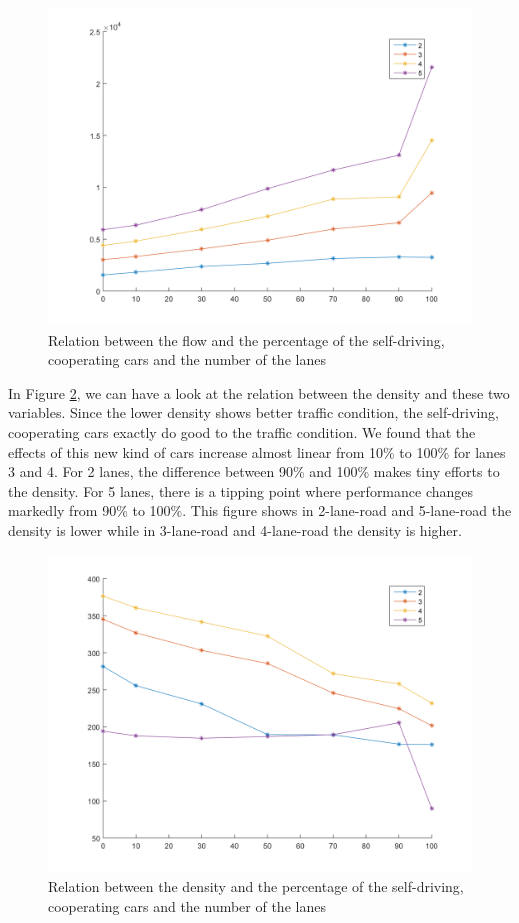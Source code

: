\documentclass[a4paper]{article}
\begin{document}
	\begin{figure}[H]
		\centering
		\includegraphics[scale=0.5]{../imgs/all_2}
		\caption{Relation between the flow and the percentage of the self-driving, cooperating cars and the number of the lanes}
		\label{all_2}
	\end{figure}

	In Figure \ref{all_3}, we can have a look at the relation between the density and these two variables. Since the lower density shows better traffic condition, the self-driving, cooperating cars exactly do good to the traffic condition.  We found that the effects of this new kind of cars increase almost linear from 10\% to 100\% for lanes 3 and 4. For 2 lanes, the difference between 90\% and 100\% makes tiny efforts to the density. For 5 lanes, there is a tipping point where performance changes markedly from 90\% to 100\%. This figure shows in 2-lane-road and 5-lane-road the density is lower while in 3-lane-road and 4-lane-road the density is higher.

	\begin{figure}[H]
		\centering
		\includegraphics[scale=0.5]{../imgs/all_3}
		\caption{Relation between the density and the percentage of the self-driving, cooperating cars and the number of the lanes}
		\label{all_3}
	\end{figure}
\end{document}
